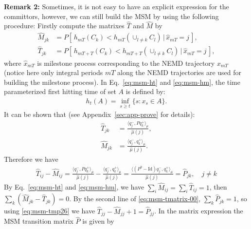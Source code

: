 \documentclass[aps, pre, preprint,unsortedaddress,a4paper,onecolumn]{revtex4}
\newcommand{\recheck}[1]{{\color{red} #1}}
\newcommand{\fwd}[0]{+}
\newcommand{\bwd}[0]{-}
\newcommand{\id}{\mathrm{Id}}
\begin{document}
\noindent\textbf{Remark 2:}
Sometimes, it is not easy to have an explicit expression for the committors, however, we
can still build the MSM by using the following procedure: Firstly compute the
matrixes $\hat T$ and $\hat M$ by
\begin{align}\label{eq:msm-ht}
  \hat M_{jk} &= P [\,h_{mT}(C_k) < h_{mT}(\cup_{l\neq k}C_l) \,\vert\, \hat x_{mT} = j\,],\\\label{eq:msm-hm}
  \hat T_{jk} &= P [\,h_{mT+T}(C_k) < h_{mT+T}(\cup_{l\neq k}C_l) \,\vert\, \hat x_{mT} = j\,],
\end{align}
where $\hat x_{mT}$ is milestone process corresponding to the NEMD trajectory $x_{mT}$ (notice here
only integral periods $mT$ along the NEMD trajectories are used for building the milestone process).
In Eq.~\eqref{eq:msm-ht} and \eqref{eq:msm-hm}, the time parameterized first hitting time of  set $A$ is defined by:
\begin{align}
  h_{t}(A) = \inf_{s\geq t}\{ s : x_s \in A \}.
\end{align}
It can be shown that (see Appendix~\ref{sec:app-prove} for details):
\begin{align}\label{eq:msm-ht-1}
  \hat T_{jk} &= \frac{\langle q_j^\bwd, P q_k^\fwd \rangle_\mu}{\hat \mu(j)},\\\label{eq:msm-hm-1}
  \hat M_{jk} &= \frac{\langle q_j^\bwd, q_k^\fwd \rangle_\mu}{\hat \mu(j)}.
\end{align}
Therefore we have
\begin{align}\label{eq:msm-tmp26}
  \hat T_{ij} - \hat M_{ij}
  = \frac{\langle q_j^\bwd, P q_k^\fwd \rangle_\mu}{\hat \mu(j)}
  - \frac{\langle q_j^\bwd,  q_k^\fwd \rangle_\mu}{\hat \mu(j)}
  = \frac{\langle (P^b - \id) q_j^\bwd, q_k^\fwd \rangle_\mu}{\hat \mu(j)}
  = \hat P_{jk}, \quad j\neq k
\end{align}
By Eq.~\eqref{eq:msm-ht} and \eqref{eq:msm-hm}, we have $\sum_i\hat M_{ij} = \sum_i\hat T_{ij} = 1$, then
$\sum_k(\hat M_{jk}- \hat T_{jk}) = 0$. By the second line of \eqref{eq:msm-tmatrix-00}, $\sum_k\hat P_{jk} = 1$, so using \eqref{eq:msm-tmp26} we have
$\hat T_{jj} - \hat M_{jj} + 1 = \hat P_{jj}$.
In the matrix expression the MSM transition matrix $\hat P$ is given by
\end{document}
